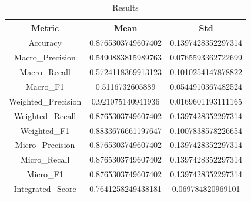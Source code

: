 \begin{table}[htbp]
\centering
\caption{Results}
\label{tab:csv}
\small
\setlength{\tabcolsep}{4pt}
\begin{tabular}{|c|c|c|}
\hline
Metric & Mean & Std \\
\hline
Accuracy & 0.8765303749607402 & 0.1397428352297314 \\
Macro_Precision & 0.5490883815989763 & 0.0765593362722699 \\
Macro_Recall & 0.5724118369913123 & 0.1010254147878822 \\
Macro_F1 & 0.5116732605889 & 0.0544910367482524 \\
Weighted_Precision & 0.921075140941936 & 0.0169601193111165 \\
Weighted_Recall & 0.8765303749607402 & 0.1397428352297314 \\
Weighted_F1 & 0.8833676661197647 & 0.1007838578226654 \\
Micro_Precision & 0.8765303749607402 & 0.1397428352297314 \\
Micro_Recall & 0.8765303749607402 & 0.1397428352297314 \\
Micro_F1 & 0.8765303749607402 & 0.1397428352297314 \\
Integrated_Score & 0.7641258249438181 & 0.069784820969101 \\
\hline
\end{tabular}
\end{table}